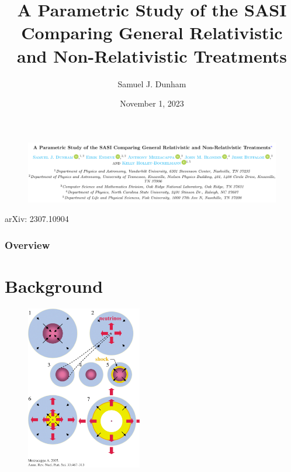 \documentclass{beamer}
\title[Vanderbilt AJRC]{A Parametric Study of the SASI Comparing
General Relativistic and Non-Relativistic Treatments}
\author{Samuel J. Dunham}
\date{November 1, 2023}
\begin{document}
\begin{frame}

  \titlepage

\end{frame}

\begin{frame}

  \begin{figure}[htb!]
    \centering
    \includegraphics[width=\textwidth]{fig.paperTitle.png}
  \end{figure}

  \centerline{arXiv: 2307.10904}

\end{frame}



\begin{frame}
\frametitle{Overview}

  \tableofcontents

\end{frame}


\section{Background}

\begin{frame}

  \begin{figure}[htb!]
    \centering
    \includegraphics[width=0.45\textwidth]{fig.explosion.jpeg}
  \end{figure}

\end{frame}
\end{document}
